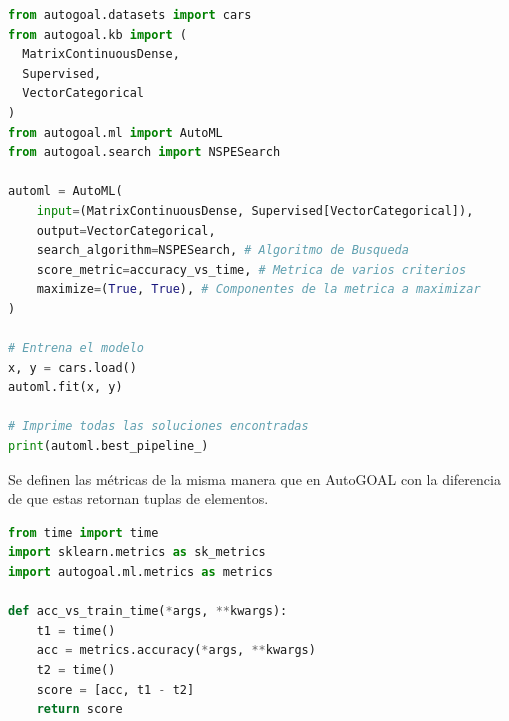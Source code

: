 \begin{lstlisting}[caption=Utilizando NPSGE, language=Python]
from autogoal.datasets import cars
from autogoal.kb import (
  MatrixContinuousDense,
  Supervised,
  VectorCategorical
)
from autogoal.ml import AutoML
from autogoal.search import NSPESearch

automl = AutoML(
    input=(MatrixContinuousDense, Supervised[VectorCategorical]),
    output=VectorCategorical,
    search_algorithm=NSPESearch, # Algoritmo de Busqueda
    score_metric=accuracy_vs_time, # Metrica de varios criterios
    maximize=(True, True), # Componentes de la metrica a maximizar
)

# Entrena el modelo
x, y = cars.load()
automl.fit(x, y)

# Imprime todas las soluciones encontradas
print(automl.best_pipeline_) 
\end{lstlisting}

Se definen las m\'etricas de la misma manera que en AutoGOAL con la diferencia de que estas retornan tuplas de elementos.

\begin{lstlisting}[caption=Ejemplo de m\'etricas, language=Python]
from time import time
import sklearn.metrics as sk_metrics
import autogoal.ml.metrics as metrics

def acc_vs_train_time(*args, **kwargs):
    t1 = time()
    acc = metrics.accuracy(*args, **kwargs)
    t2 = time()
    score = [acc, t1 - t2]
    return score
\end{lstlisting}
